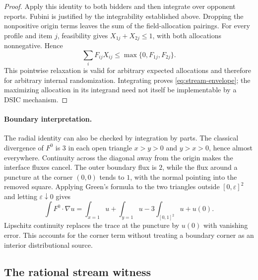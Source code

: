\begin{proof}
Apply this identity to both bidders and then integrate over opponent reports.
Fubini is justified by the integrability established above.  Dropping the
nonpositive origin terms leaves the sum of the field-allocation pairings.
For every profile and item \(j\), feasibility gives
\(X_{1j}+X_{2j}\leq1\), with both allocations nonnegative.  Hence
\[
\sum_i F_{ij}X_{ij}
\leq
\max\{0,F_{1j},F_{2j}\}.
\]
This pointwise relaxation is valid for arbitrary expected allocations and
therefore for arbitrary internal randomization.  Integrating proves
\eqref{eq:stream-envelope}; the maximizing allocation in its integrand need
not itself be implementable by a DSIC mechanism.
\end{proof}

\paragraph{Boundary interpretation.}
The radial identity can also be checked by integration by parts.  The
classical divergence of \(F^0\) is \(3\) in each open triangle \(x>y>0\) and
\(y>x>0\), hence almost everywhere.  Continuity across the diagonal away
from the origin makes the interface fluxes cancel.  The outer boundary flux
is \(2\), while the flux around a puncture at the corner \((0,0)\) tends to
\(1\), with the normal pointing into the removed square.  Applying Green's
formula to the two triangles outside \([0,\varepsilon]^2\) and letting
\(\varepsilon\downarrow0\) gives
\[
\int F^0\cdot\nabla u
=\int_{x=1}u+\int_{y=1}u-3\int_{[0,1]^2}u+u(0).
\]
Lipschitz continuity replaces the trace at the puncture by \(u(0)\) with
vanishing error.  This accounts for the corner term without treating a
boundary corner as an interior distributional source.

\subsection{The rational stream witness}\label{subsec:witness}

